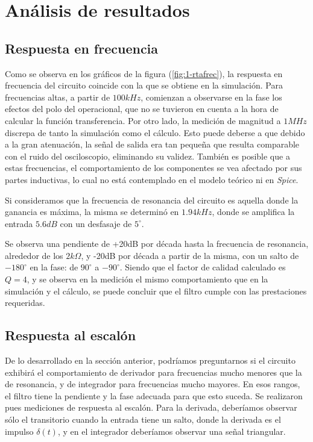 \documentclass[../../tc_tp3_main.tex]{subfiles}
\begin{document}
\section{An\'alisis de resultados}

\subsection{Respuesta en frecuencia}



Como se observa en los gr\'aficos de la figura (\ref{fig:1-rtafrec}), la respuesta en frecuencia del circuito coincide con la que se obtiene en la simulaci\'on. Para frecuencias altas, a partir de $100kHz$, comienzan a observarse en la fase los efectos del polo del operacional, que no se tuvieron en cuenta a la hora de calcular la funci\'on transferencia. Por otro lado, la medici\'on de magnitud a $1MHz$ discrepa de tanto la simulaci\'on como el c\'alculo. Esto puede deberse a que debido a la gran atenuaci\'on, la se\~nal de salida era tan peque\~na que resulta comparable con el ruido del osciloscopio, eliminando su validez. Tambi\'en es posible que a estas frecuencias, el comportamiento de los componentes se vea afectado por sus partes inductivas, lo cual no est\'a contemplado en el modelo te\'orico ni en \textit{Spice}. \par

Si consideramos que la frecuencia de resonancia del circuito es aquella donde la ganancia es m\'axima, la misma se determin\'o en $1.94kHz$, donde se amplifica la entrada $5.6dB$ con un desfasaje de $5^\circ$.\par

Se observa una pendiente de +20dB por d\'ecada hasta la frecuencia de resonancia, alrededor de los $2k\Omega$, y -20dB por d\'ecada a partir de la misma, con un salto de $-180^\circ$ en la fase: de $90^\circ$ a $-90^\circ$. Siendo que el factor de calidad calculado es $Q=4$, y se observa en la medici\'on el mismo comportamiento que en la simulaci\'on y el c\'alculo, se puede concluir que el filtro cumple con las prestaciones requeridas. 

\subsection{Respuesta al escal\'on}

De lo desarrollado en la secci\'on anterior, podr\'iamos preguntarnos si el circuito exhibir\'a el comportamiento de derivador para frecuencias mucho menores que la de resonancia, y de integrador para frecuencias mucho mayores. En esos rangos, el filtro tiene la pendiente y la fase adecuada para que esto suceda. Se realizaron pues mediciones de respuesta al escal\'on. Para la derivada, deber\'iamos observar s\'olo el transitorio cuando la entrada tiene un salto, donde la derivada es el impulso $\delta(t)$, y en el integrador deber\'iamos observar una se\~nal triangular.
\end{document}
